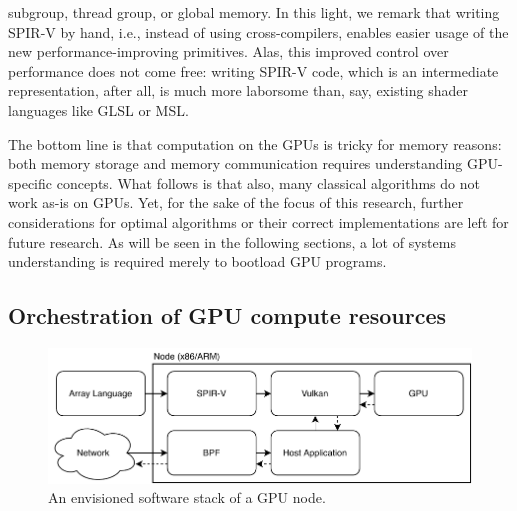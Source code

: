 \documentclass{IEEEtran}
\begin{document}
subgroup, thread group, or global memory. In this light, we remark that writing SPIR-V by hand, i.e., instead of using cross-compilers, enables easier usage of the new performance-improving primitives. Alas, this improved control over performance does not come free: writing SPIR-V code, which is an intermediate representation, after all, is much more laborsome than, say, existing shader languages like \gls{GLSL} or \gls{MSL}.

The bottom line is that computation on the GPUs is tricky for memory reasons: both memory storage and memory communication requires understanding GPU-specific concepts. What follows is that also, many classical algorithms do not work as-is on GPUs. Yet, for the sake of the focus of this research, further considerations for optimal algorithms or their correct implementations are left for future research. As will be seen in the following sections, a lot of systems understanding is required merely to bootload GPU programs.

\subsection{Orchestration of GPU compute resources}
\label{ch:sysarch}

\begin{figure}
  \centering
  \includegraphics[width=\columnwidth]{system}
  \caption{An envisioned software stack of a GPU node.}
  \label{fig:system}
\end{figure}
\end{document}
